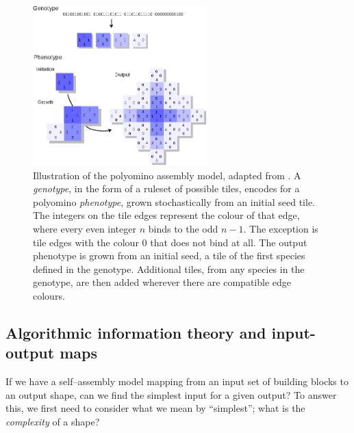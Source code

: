 \begin{figure}[h]
    \centering
    \includegraphics[width=0.6\textwidth]{figures/polyominoes.eps}
    \caption{Illustration of the polyomino assembly model, adapted from \cite{johnston2011evolutionary}. A \emph{genotype}, in the form of a ruleset of possible tiles, encodes for a polyomino \emph{phenotype}, grown stochastically from an initial seed tile. The integers on the tile edges represent the colour of that edge, where every even integer \(n\) binds to the odd \(n-1\). The exception is tile edges with the colour \(0\) that does not bind at all. The output phenotype is grown from an initial seed, a tile of the first species defined in the genotype. Additional tiles, from any species in the genotype, are then added wherever there are compatible edge colours.}
    \label{fig:polyominoes}
\end{figure}

\subsection{Algorithmic information theory and input-output maps}
\label{sec:AIT}




If we have a self--assembly model mapping from an input set of building blocks to an output shape, can we find the simplest input for a given output? To answer this, we first need to consider what we mean by ``simplest''; what is the \emph{complexity} of a shape?

